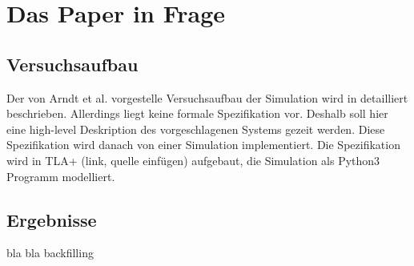 \chapter{Das Paper in Frage}
\label{chap:ein}

\section{Versuchsaufbau}
Der von Arndt et al. vorgestelle Versuchsaufbau der Simulation wird in \cite{Arn99} detailliert beschrieben. Allerdings liegt keine formale Spezifikation vor. Deshalb soll hier eine high-level Deskription des vorgeschlagenen Systems gezeit werden. Diese Spezifikation wird danach von einer Simulation implementiert. Die Spezifikation wird in TLA+ (link,  quelle einfügen) aufgebaut, die Simulation als Python3 Programm modelliert.

\section{Ergebnisse}
bla bla backfilling